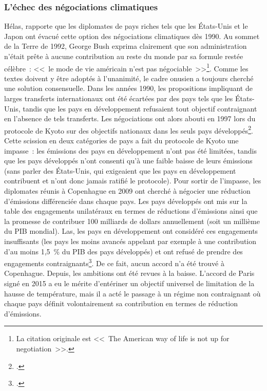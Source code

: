 \documentclass[a5paper,french,openany]{memoir}
\begin{document}
\subsubsection{L'échec des négociations climatiques}
Hélas, \citet{bertram_tradeable_1992} rapporte que les diplomates de pays riches tels que les États-Unis et le Japon ont évacué cette option des négociations climatiques dès 1990. Au sommet de la Terre de 1992, George Bush exprima clairement que son administration n'était prête à aucune contribution au reste du monde par sa formule restée célèbre~: <<~le mode de vie américain n'est pas négociable~>>\footnote{La citation originale est <<~The American way of life is not up for negotiation~>>.}. %
Comme les textes doivent y être adoptés à l'unanimité, le cadre onusien a toujours cherché une solution consensuelle. Dans les années 1990, les propositions impliquant de larges transferts internationaux ont été écartées par des pays tels que les États-Unis, tandis que les pays en développement refusaient tout objectif contraignant en l'absence de tels transferts. Les négociations ont alors abouti en 1997 lors du protocole de Kyoto sur des objectifs nationaux dans les seuls pays développés\footnote{\cite{gupta_history_2010}.}. Cette scission en deux catégories de pays a fait du protocole de Kyoto une impasse~: les émissions des pays en développement n'ont pas été limitées, tandis que les pays développés n'ont consenti qu'à une faible baisse de leurs émissions (sans parler des États-Unis, qui exigeaient que les pays en développement contribuent et n'ont donc jamais ratifié le protocole). Pour sortir de l'impasse, les diplomates réunis à Copenhague en 2009 ont cherché à négocier une réduction d'émissions différenciée dans chaque pays. Les pays développés ont mis sur la table des engagements unilatéraux en termes de réductions d'émissions ainsi que la promesse de contribuer 100 milliards de dollars annuellement (soit un millième du PIB mondial). Las, les pays en développement ont considéré ces engagements insuffisants (les pays les moins avancés appelant par exemple à une contribution d'au moins 1,5~\% du PIB des pays développés) et ont refusé de prendre des engagements contraignants\footnote{\cite{dimitrov_inside_2010}.}. De ce fait, aucun accord n'a été trouvé à Copenhague. Depuis, les ambitions ont été revues à la baisse. L'accord de Paris signé en 2015  a eu le mérite d'entériner un objectif universel de limitation de la hausse de température, mais il a acté le passage à un régime non contraignant où chaque pays définit volontairement sa contribution en termes de réduction d'émissions. 
\end{document}
